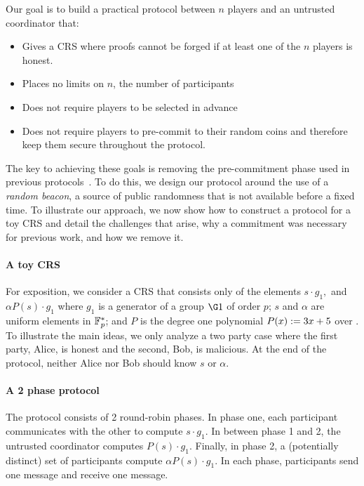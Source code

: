 \documentclass{article}
\begin{document}
Our goal is to build a practical  protocol between $n$ players  and an untrusted coordinator that:
\begin{itemize}
  \item Gives a {\snark}  CRS  where proofs cannot be forged if at least one of the $n$ players is honest.
  \item Places no limits on $n$, the number of participants 
  \item Does not require players to be selected in advance 
  \item Does not require players to pre-commit to their random coins and therefore keep them secure throughout the protocol.
\end{itemize}

The key to achieving these goals is removing the pre-commitment phase used in previous protocols~\cite{BGG17,BCGTV15}. To do this, we design our protocol around the use of a \emph{random beacon}, a source of public randomness that is not available before a fixed time.  
To illustrate our approach, we now show how to construct a protocol for a toy CRS  and detail the challenges that arise, why a commitment was necessary for previous work, and how we remove it.

\paragraph*{A toy CRS} For exposition, we consider a CRS that consists only of the elements $s\cdot g_1,$ and ${\alpha P(s)}\cdot g_1$ where $g_1$ is a generator of a  group $\G1$ of order $p$;
$s$ and $\alpha$ are uniform elements in ${\mathbb F}_p^*$; and $P$ is the degree one polynomial $P(x):= 3x +5$ over \F. To illustrate the main ideas, we only analyze a two party case where the first party, Alice, is honest and the second, Bob, is malicious. At the end of the protocol, neither Alice nor Bob should know $s$ or $\alpha$.


\paragraph*{A 2 phase protocol} The protocol  consists of 2 round-robin phases. In phase one, each participant communicates with the other to compute $s \cdot g_1$. In between  phase 1 and 2, the  untrusted coordinator  computes $P(s)\cdot g_1$. Finally, in phase 2, a (potentially distinct) set of participants compute $\alpha P(s) \cdot g_1$. In each phase, participants send one message and receive one message.
\end{document}
